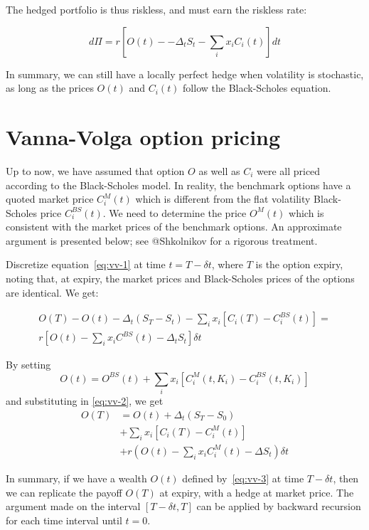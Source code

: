 \documentclass[]{tufte-book}
\begin{document}
The hedged portfolio is thus riskless, and must earn the riskless rate:

\begin{equation}
  d\Pi =  r \left[ O(t) - -\Delta_t S_t - \sum_i x_i C_i(t) \right] dt
\label{eq:vv-1}
\end{equation}

In summary, we can still have a locally perfect hedge when volatility is
stochastic, as long as the prices \(O(t)\) and \(C_i(t)\) follow the
Black-Scholes equation.

\hypertarget{vanna-volga-option-pricing}{%
\section{Vanna-Volga option pricing}\label{vanna-volga-option-pricing}}

Up to now, we have assumed that option \(O\) as well as \(C_i\) were all priced according to the Black-Scholes model. In reality, the benchmark options have a quoted market price \(C_i^M(t)\) which is different from the flat volatility Black-Scholes price \(C_i^{BS}(t)\). We need to determine the price \(O^M(t)\) which is consistent with the market prices of the benchmark options. An approximate argument is presented below; see @Shkolnikov
for a rigorous treatment.

Discretize equation~\eqref{eq:vv-1} at time \(t=T-\delta t\), where \(T\) is the
option expiry, noting that, at expiry, the market prices and Black-Scholes prices of the options are identical. We get:

\begin{align}
O(T) - O(t) - \Delta_t (S_T - S_t) - \sum_i x_i \left[C_i(T)-C_i^{BS}(t) \right] = \\
r \left[O(t) - \sum_i x_i C^{BS}(t) - \Delta_t S_t \right] \delta t
\label{eq:vv-2}
\end{align}

By setting
\[
O(t) = O^{BS}(t) + \sum_i x_i \left[ C^M_i(t,K_i) - C^{BS}_i(t,K_i) \right]
\label{eq:vv-3}
\]
and substituting in \eqref{eq:vv-2}, we get
\begin{align}
O(T) &= O(t) + \Delta_t (S_T - S_0) \\
&+ \sum_i x_i \left[C_i(T) - C^M_i(t) \right] \\
&+ r \left(O(t) - \sum_i x_i C^M_i(t) - \Delta S_t \right) \delta t
\end{align}

In summary, if we have a wealth \(O(t)\) defined by~\eqref{eq:vv-3} at
time \(T-\delta t\), then we can replicate the payoff \(O(T)\) at expiry,
with a hedge at market price. The argument made on the interval
\([T-\delta t, T]\) can be applied by backward recursion for each time
interval until \(t=0\).
\end{document}
